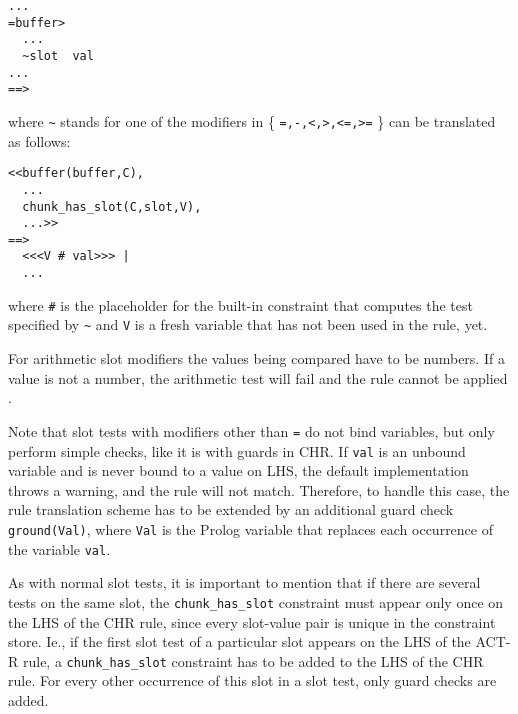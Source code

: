 \begin{lstlisting}
...
=buffer>
  ...
  ~slot  val
...
==>
\end{lstlisting}

where \lstinline|~| stands for one of the modifiers in \{ \lstinline|=,-,<,>,<=,>=| \} can be translated as follows:

\begin{lstlisting}
<<buffer(buffer,C),
  ...
  chunk_has_slot(C,slot,V),
  ...>>
==>
  <<<V # val>>> |
  ...
\end{lstlisting}

where \lstinline|#| is the placeholder for the built-in constraint that computes the test specified by \lstinline|~| and \lstinline|V| is a fresh variable that has not been used in the rule, yet.

For arithmetic slot modifiers the values being compared have to be numbers. If a value is not a number, the arithmetic test will fail and the rule cannot be applied \cite{actr_reference}.

Note that slot tests with modifiers other than \lstinline|=| do not bind variables, but only perform simple checks, like it is with guards in CHR. If \lstinline|val| is an unbound variable and is never bound to a value on LHS, the default implementation throws a warning, and the rule will not match. Therefore, to handle this case, the rule translation scheme has to be extended by an additional guard check \lstinline|ground(Val)|, where \lstinline|Val| is the Prolog variable that replaces each occurrence of the variable \lstinline|val|.

As with normal slot tests, it is important to mention that if there are several tests on the same slot, the \lstinline|chunk_has_slot| constraint must appear only once on the LHS of the CHR rule, since every slot-value pair is unique in the constraint store. Ie., if the first slot test of a particular slot appears on the LHS of the ACT-R rule, a \lstinline|chunk_has_slot| constraint has to be added to the LHS of the CHR rule. For every other occurrence of this slot in a slot test, only guard checks are added.

